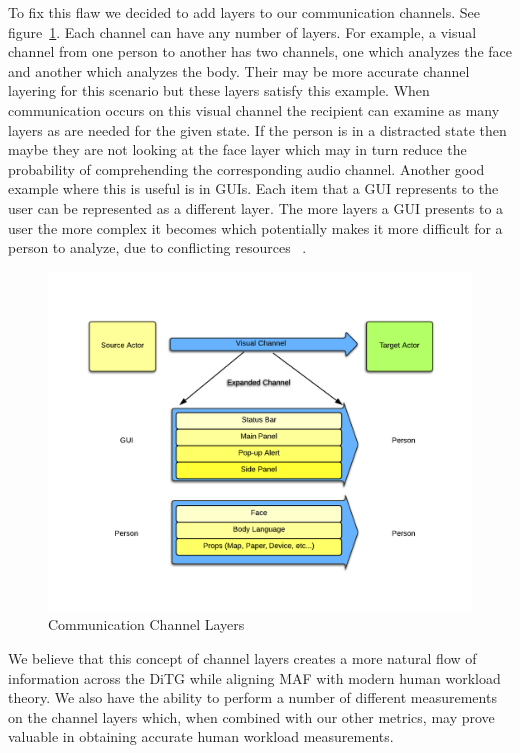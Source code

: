To fix this flaw we decided to add layers to our communication channels. See figure~\ref{fig:layers}.  Each channel can have any number of layers.  For example, a visual channel from one person to another has two channels, one which analyzes the face and another which analyzes the body.  Their may be more accurate channel layering for this scenario but these layers satisfy this example.  When communication occurs on this visual channel the recipient can examine as many layers as are needed for the given state.  If the person is in a distracted state then maybe they are not looking at the face layer which may in turn reduce the probability of comprehending the corresponding audio channel.   Another good example where this is useful is in GUIs.  Each item that a GUI represents to the user can be represented as a different layer.  The more layers a GUI presents to a user the more complex it becomes which potentially makes it more difficult for a person to analyze, due to conflicting resources ~\cite{salvucci2008threaded}.

\begin{figure}[h]
\begin{center}
\includegraphics[width=5in]{layers.png}
\caption{Communication Channel Layers}
\label{fig:layers}
\end{center}
\end{figure}

We believe that this concept of channel layers creates a more natural flow of information across the DiTG while aligning MAF with modern human workload theory.  We also have the ability to perform a number of different measurements on the channel layers which, when combined with our other metrics, may prove valuable in obtaining accurate human workload measurements.

